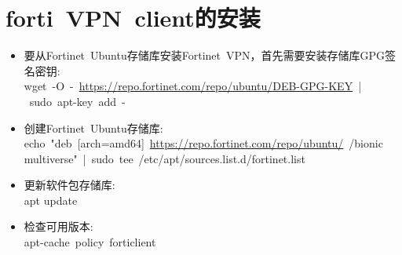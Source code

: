 \documentclass[10pt,a4paper]{article}
\begin{document}
\section{\rm{forti~VPN~client}的安装}
\begin{itemize}
	\item 要从\textrm{Fortinet~Ubuntu}存储库安装\textrm{Fortinet~VPN}，首先需要安装存储库\textrm{GPG}签名密钥:\\
		\textrm{wget~-O~-~\url{https://repo.fortinet.com/repo/ubuntu/DEB-GPG-KEY}~|~sudo~apt-key~add~-~}
	\item 创建\textrm{Fortinet~Ubuntu}存储库:\\ 
		\textrm{echo~"deb~[arch=amd64]~\url{https://repo.fortinet.com/repo/ubuntu/}~/bionic multiverse"~|~sudo~tee~/etc/apt/sources.list.d/fortinet.list}
	\item 更新软件包存储库:\\
		\textrm{apt update}
	\item 检查可用版本:\\
		\textrm{apt-cache~policy~forticlient}
\end{itemize}


\end{document}
